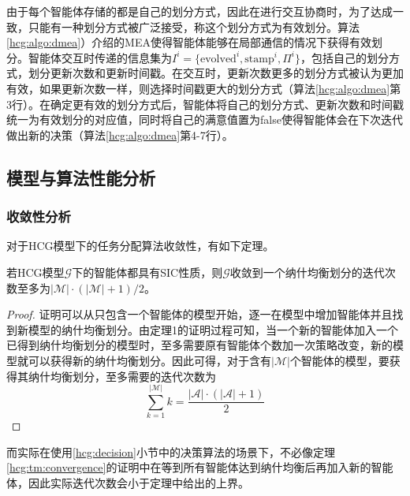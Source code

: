 由于每个智能体存储的都是自己的划分方式，因此在进行交互协商时，为了达成一致，只能有一种划分方式被广泛接受，称这个划分方式为有效划分。算法\ref{hcg:algo:dmea}）介绍的MEA使得智能体能够在局部通信的情况下获得有效划分。智能体交互时传递的信息集为$I^i=\{\text{evolved}^i,\text{stamp}^i,\Pi^i\}$，包括自己的划分方式，划分更新次数和更新时间戳。在交互时，更新次数更多的划分方式被认为更加有效，如果更新次数一样，则选择时间戳更大的划分方式（算法\ref{hcg:algo:dmea}第3行）。在确定更有效的划分方式后，智能体将自己的划分方式、更新次数和时间戳统一为有效划分的对应值，同时将自己的满意值置为false使得智能体会在下次迭代做出新的决策（算法\ref{hcg:algo:dmea}第4-7行）。


\subsection{模型与算法性能分析}
\label{hcg:performance}

\subsubsection{收敛性分析}
\label{perform:convergence}

对于HCG模型下的任务分配算法收敛性，有如下定理。

\begin{theorem}[收敛性]
\label{hcg:tm:convergence}
	若HCG模型$\mathcal{G}$下的智能体都具有SIC性质，则$\mathcal{G}$收敛到一个纳什均衡划分的迭代次数至多为$|\mathcal{M}|\cdot(|\mathcal{M}|+1)/2$。
	\begin{proof}
		证明可以从只包含一个智能体的模型开始，逐一在模型中增加智能体并且找到新模型的纳什均衡划分。由定理1的证明过程可知，当一个新的智能体加入一个已得到纳什均衡划分的模型时，至多需要原有智能体个数加一次策略改变，新的模型就可以获得新的纳什均衡划分。因此可得，对于含有$|\mathcal{M}|$个智能体的模型，要获得其纳什均衡划分，至多需要的迭代次数为
		\begin{equation}
		\label{hcg:eq:maxIter}
			\sum_{k=1}^{|\mathcal{M}|} k = \frac{|\mathcal{A}|\cdot(|\mathcal{A}|+1)}{2}
		\end{equation}
		
	\end{proof}
\end{theorem}

而实际在使用\ref{hcg:decision}小节中的决策算法的场景下，不必像定理\ref{hcg:tm:convergence}的证明中在等到所有智能体达到纳什均衡后再加入新的智能体，因此实际迭代次数会小于定理中给出的上界。


